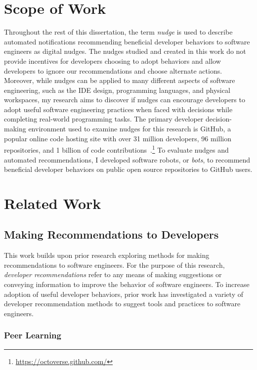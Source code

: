 \section{Scope of Work}

Throughout the rest of this dissertation, the term \textit{nudge} is used to describe automated notifications recommending beneficial developer behaviors to software engineers as digital nudges. The nudges studied and created in this work do not provide incentives for developers choosing to adopt behaviors and allow developers to ignore our recommendations and choose alternate actions. Moreover, while nudges can be applied to many different aspects of software engineering, such as the IDE design, programming languages, and physical workspaces, my research aims to discover if nudges can encourage developers to adopt useful software engineering practices when faced with decisions while completing real-world programming tasks. The primary developer decision-making environment used to examine nudges for this research is GitHub, a popular online code hosting site with over 31 million developers, 96 million repositories, and 1 billion of code contributions~\cite{Octoverse}.\footnote{\url{https://octoverse.github.com/}} To evaluate nudges and automated recommendations, I developed software robots, or \textit{bots}, to recommend beneficial developer behaviors on public open source repositories to GitHub users.

\section{Related Work}

\subsection{Making Recommendations to Developers}

This work builds upon prior research exploring methods for making recommendations to software engineers. For the purpose of this research, \textit{developer recommendations} refer to any means of making suggestions or conveying information to improve the behavior of software engineers. To increase adoption of useful developer behaviors, prior work has investigated a variety of developer recommendation methods to suggest tools and practices to software engineers.

\subsubsection{Peer Learning}


